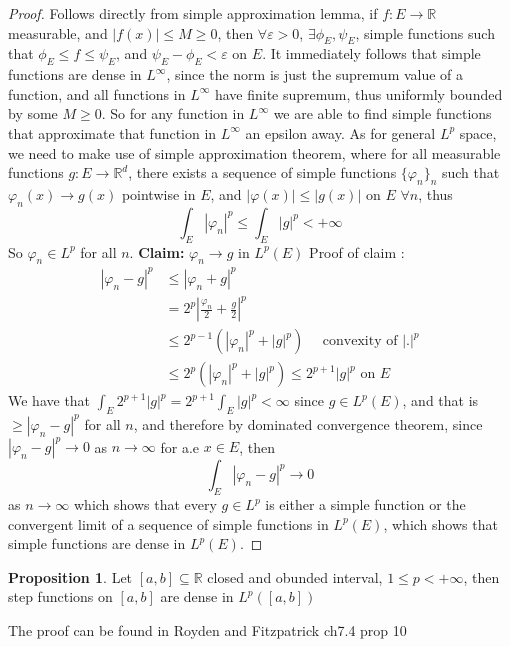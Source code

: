 \documentclass[12pt]{article}
\theoremstyle{definition}
\newtheorem{proposition}{Proposition}[section]
\begin{document}
	\begin{proof}
		Follows directly from simple approximation lemma, if $f \colon E \to \mathbb{R}$ measurable, and $|f(x)| \leq M \geq 0$, then $\forall \varepsilon >0$, $\exists \phi_E, \psi_E$, simple functions such that $\phi_E \leq f \leq \psi_E$, and $\psi_E - \phi_E < \varepsilon$ on $E$. It immediately follows that simple functions are dense in $L^\infty$, since the norm is just the supremum value of a function, and all functions in $L^\infty$ have finite supremum, thus uniformly bounded by some $M \geq 0$. So for any function in $L^\infty$ we are able to find simple functions that approximate that function in $L^\infty$ an epsilon away. As for general $L^p$ space, we need to make use of simple approximation theorem, where for all measurable functions $g \colon E \to \mathbb{R}^d$, there exists a sequence of simple functions $\{\varphi_n\}_n$ such that $\varphi_n(x) \to g(x)$ pointwise in $E$, and $|\varphi(x)| \leq |g(x)|$ on $E$ $\forall n$, thus 
		$$ \int_{E} |\varphi_n|^p \leq \int_{E} |g|^p < +\infty$$
		So $\varphi_n \in L^p $ for all $n$. \textbf{Claim: } $\varphi_n \to g$ in $L^p (E)$
		Proof of claim : 
		\begin{align*}
			|\varphi_n - g|^p &\leq |\varphi_n + g|^p \\
					  &= 2^p |\frac{\varphi_n}{2} + \frac{g}{2}|^p \\
					  &\leq 2^{p-1} (|\varphi_n|^p + |g|^p )\quad \text{ convexity of $|.|^p$}\\
					  &\leq 2^p (|\varphi_n|^p  + |g|^p )\leq 2^{p+1}|g|^p \text{ on $E$}
		\end{align*}
		We have that $\int_{E} 2^{p+1}|g|^p  = 2^{p+1} \int_{E}|g|^p < \infty$ since $g \in L^p(E)$, and that is $\geq |\varphi_n -  g|^p $ for all $n$, and therefore by dominated convergence theorem, since $|\varphi_n - g|^p \to 0$ as $n \to \infty$ for a.e $x \in E$, then
		$$\int_{E} |\varphi_n - g|^p \to 0$$ as $n \to \infty$
		which shows that every $g \in L^p$ is either a simple function or the convergent limit of a sequence of simple functions in $L^p(E)$, which shows that simple functions are dense in $L^p(E)$. 

	\end{proof}
	\begin{proposition}
		Let $[a,b] \subseteq \mathbb{R}$ closed and obunded interval, $1\leq p < +\infty $, then step functions on $[a,b]$ are dense in $L^p([a,b])$
	\end{proposition}
	The proof can be found in Royden and Fitzpatrick ch7.4 prop 10
\end{document}
